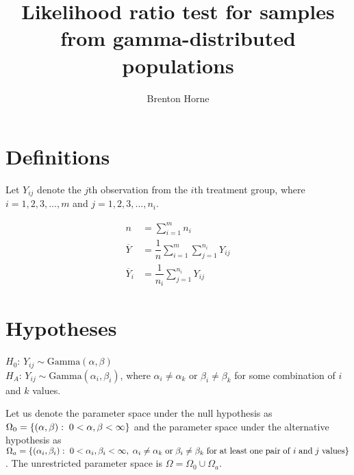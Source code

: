 \documentclass[12pt,a4paper,openright]{article}
\title{Likelihood ratio test for samples from gamma-distributed populations}
\author{Brenton Horne}
\newcommand{\GamD}{\mathrm{Gamma}}
\begin{document}
	\maketitle
	\tableofcontents
	\newpage
	
	\section{Definitions}
	Let $Y_{ij}$ denote the $j$th observation from the $i$th treatment group, where $i=1, 2, 3, ..., m$ and $j=1, 2, 3, ..., n_i$. 
	
	\begin{align*}
		n &= \sum_{i=1}^m n_i \\
		\overline{Y} &= \dfrac{1}{n} \sum_{i=1}^m \sum_{j=1}^{n_i} Y_{ij} \\
		\overline{Y}_i &= \dfrac{1}{n_i} \sum_{j=1}^{n_i} Y_{ij}
	\end{align*}
	
	\section{Hypotheses}
	$H_0$: $Y_{ij} \sim \GamD(\alpha, \beta)$ \\
	$H_A$: $Y_{ij} \sim \GamD(\alpha_i, \beta_i)$, where $\alpha_i \neq \alpha_k$ or $\beta_i \neq \beta_k$ for some combination of $i$ and $k$ values. 
	
	Let us denote the parameter space under the null hypothesis as $\Omega_0 = \left\{(\alpha, \beta): \hspace{0.1cm} 0 < \alpha, \beta < \infty\right\}$ and the parameter space under the alternative hypothesis as \\$\Omega_a = \left\{(\alpha_i, \beta_i): \hspace{0.1cm} 0 < \alpha_i, \beta_i < \infty,\hspace{0.1cm}\alpha_i \neq \alpha_k \hspace{0.1cm} \mathrm{or}\hspace{0.1cm}\beta_i \neq \beta_k \hspace{0.1cm}\mathrm{for}\hspace{0.1cm}\mathrm{at}\hspace{0.1cm}\mathrm{least}\hspace{0.1cm}\mathrm{one}\hspace{0.1cm}\mathrm{pair}\hspace{0.1cm}\mathrm{of}\hspace{0.1cm}i\hspace{0.1cm}\mathrm{and}\hspace{0.1cm}j \hspace{0.1cm}\mathrm{values}\right\}$. The unrestricted parameter space is $\Omega = \Omega_0 \cup \Omega_a$. 
	
\end{document}
